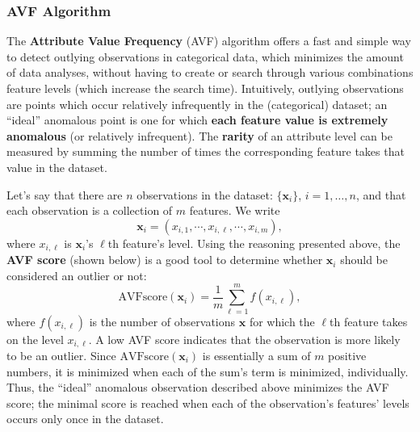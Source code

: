 \subsubsection*{AVF Algorithm}
The \textbf{Attribute Value Frequency} (AVF) algorithm offers a fast and simple way to detect outlying observations in categorical data, which minimizes the amount of data analyses, without having to create or search through various combinations feature levels (which increase the search time).  \newline\newline Intuitively, outlying observations are points which occur relatively infrequently in the (categorical) dataset;  an ``ideal'' anomalous point is one for which  \textbf{each feature value is extremely anomalous} (or relatively infrequent). 
\newline\newline The \textbf{rarity} of an attribute level can be measured by summing the number of times the corresponding feature takes that value in the dataset. 

Let's say that there are $n$ observations in the dataset: $\{\mathbf{x}_i\}$, $i = 1, \ldots, n$, and that each observation is a collection of $m$ features. We write $$\mathbf{x}_{i} = (x_{i,1}, \cdots , x_{i,\ell}, \cdots, x_{i,m}),$$ where  $x_{i,\ell}$ is $\mathbf{x}_i$'s $\ell$th feature's level. Using the reasoning presented above, the \textbf{AVF score} (shown below) is a good tool to determine whether  $\textbf{x}_i$ should be considered an outlier or not:
$$\text{AVFscore}(\mathbf{x}_i) = \frac{1}{m} \sum_{\ell=1}^{m}f(x_{i,\ell}),$$
where $f(x_{i,\ell})$ is the number of observations $\mathbf{x}$ for which the  $\ell$th feature takes on the level ${x}_{i,\ell}$. A low AVF score indicates that the observation is more likely to be an outlier. 
\newline\newline Since $\text{AVFscore}(\mathbf{x}_i) $ is essentially a sum of $m$ positive numbers, it is minimized when each of the sum's term is minimized, individually. Thus, the ``ideal'' anomalous observation described above minimizes the AVF score; the minimal score is reached when each of the observation's features' levels occurs only once in the dataset.

